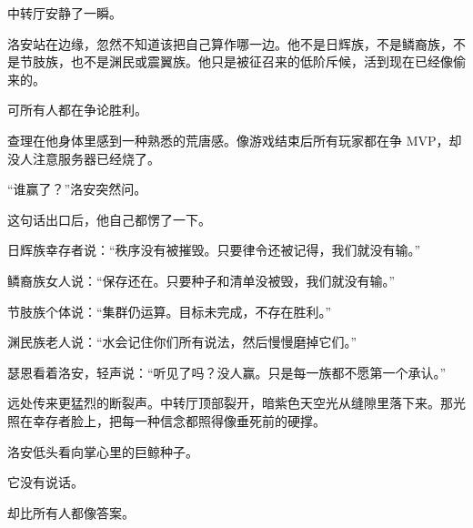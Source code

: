 中转厅安静了一瞬。

洛安站在边缘，忽然不知道该把自己算作哪一边。他不是日辉族，不是鳞裔族，不是节肢族，也不是渊民或震翼族。他只是被征召来的低阶斥候，活到现在已经像偷来的。

可所有人都在争论胜利。

查理在他身体里感到一种熟悉的荒唐感。像游戏结束后所有玩家都在争 MVP，却没人注意服务器已经烧了。

“谁赢了？”洛安突然问。

这句话出口后，他自己都愣了一下。

日辉族幸存者说：“秩序没有被摧毁。只要律令还被记得，我们就没有输。”

鳞裔族女人说：“保存还在。只要种子和清单没被毁，我们就没有输。”

节肢族个体说：“集群仍运算。目标未完成，不存在胜利。”

渊民族老人说：“水会记住你们所有说法，然后慢慢磨掉它们。”

瑟恩看着洛安，轻声说：“听见了吗？没人赢。只是每一族都不愿第一个承认。”

远处传来更猛烈的断裂声。中转厅顶部裂开，暗紫色天空光从缝隙里落下来。那光照在幸存者脸上，把每一种信念都照得像垂死前的硬撑。

洛安低头看向掌心里的巨鲸种子。

它没有说话。

却比所有人都像答案。
